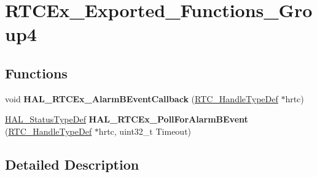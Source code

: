 \hypertarget{group___r_t_c_ex___exported___functions___group4}{}\section{R\+T\+C\+Ex\+\_\+\+Exported\+\_\+\+Functions\+\_\+\+Group4}
\label{group___r_t_c_ex___exported___functions___group4}
\subsection*{Functions}
\begin{DoxyCompactItemize}
\item 
\mbox{\label{group___r_t_c_ex___exported___functions___group4_ga9da295aecbc4566dabc161437d1b95f2}} 
void {\bfseries H\+A\+L\+\_\+\+R\+T\+C\+Ex\+\_\+\+Alarm\+B\+Event\+Callback} (\hyperlink{struct_r_t_c___handle_type_def}{R\+T\+C\+\_\+\+Handle\+Type\+Def} $\ast$hrtc)
\item 
\mbox{\label{group___r_t_c_ex___exported___functions___group4_gaec42cd894d63744c4914ec6a65510cae}} 
\hyperlink{stm32f4xx__hal__def_8h_a63c0679d1cb8b8c684fbb0632743478f}{H\+A\+L\+\_\+\+Status\+Type\+Def} {\bfseries H\+A\+L\+\_\+\+R\+T\+C\+Ex\+\_\+\+Poll\+For\+Alarm\+B\+Event} (\hyperlink{struct_r_t_c___handle_type_def}{R\+T\+C\+\_\+\+Handle\+Type\+Def} $\ast$hrtc, uint32\+\_\+t Timeout)
\end{DoxyCompactItemize}


\subsection{Detailed Description}
